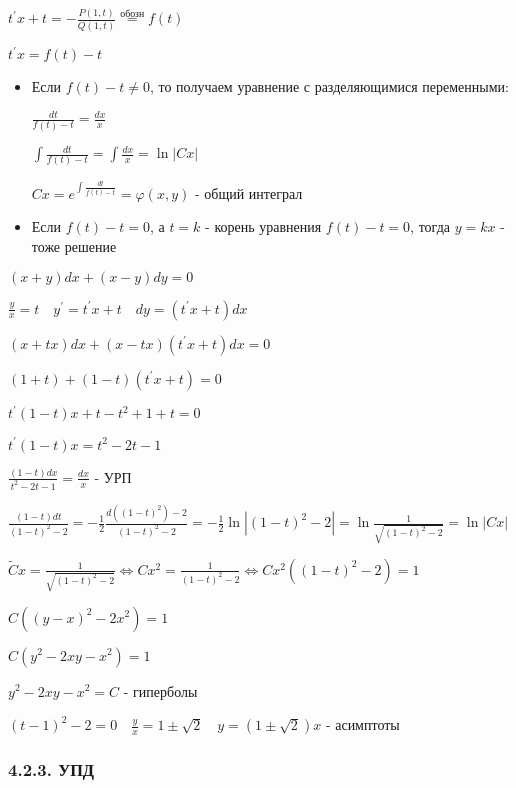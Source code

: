 \documentclass[12pt]{article}
\begin{document}
    $t^\prime x + t = -\frac{P(1, t)}{Q(1, t)} \stackrel{\text{обозн}}{=} f(t)$

    $t^\prime x = f(t) - t$

    \begin{itemize}
        \item Если $f(t) - t \neq 0$, то получаем уравнение с разделяющимися переменными:

        $\frac{dt}{f(t) - t} = \frac{dx}{x}$

        $\int\frac{dt}{f(t) - t} = \int\frac{dx}{x} = \ln|Cx|$

        $Cx = e^{\int\frac{dt}{f(t) - t}} = \varphi(x, y)$ - общий интеграл

        \item Если $f(t) - t = 0$, а $t = k$ - корень уравнения $f(t) - t = 0$, тогда $y = kx$ - тоже решение
    \end{itemize}

    \Ex $(x + y)dx + (x - y)dy = 0$

    $\frac{y}{x} = t \quad y^\prime = t^\prime x + t \quad dy = (t^\prime x + t)dx$

    $(x + tx)dx + (x - tx)(t^\prime x + t)dx = 0$

    $(1 + t) + (1 - t)(t^\prime x + t) = 0$

    $t^\prime (1 - t) x + t - t^2 + 1 + t = 0$

    $t^\prime (1 - t) x = t^2 - 2t - 1$

    $\frac{(1 - t) dx}{t^2 - 2t - 1} = \frac{dx}{x}$ - УРП

    $\frac{(1 - t)dt}{(1 - t)^2 - 2} = -\frac{1}{2}\frac{d((1 - t)^2) - 2}{(1 - t)^2 - 2} = -\frac{1}{2}\ln|(1 - t)^2 - 2| = \ln\frac{1}{\sqrt{(1 - t)^2 - 2}} = \ln|Cx|$

    $\tilde{C}x = \frac{1}{\sqrt{(1 - t)^2 - 2}} \Longleftrightarrow Cx^2 = \frac{1}{(1 - t)^2 - 2} \Longleftrightarrow Cx^2 ((1 - t)^2 - 2) = 1$

    $C ((y - x)^2 - 2x^2) = 1$

    $C (y^2 - 2xy - x^2) = 1$

    $y^2 - 2xy - x^2 = C$ - гиперболы

    $(t - 1)^2 - 2 = 0 \quad \frac{y}{x} = 1 \pm \sqrt{2} \quad y = (1 \pm \sqrt{2})x$ - асимптоты

    \hypertarget{equationincompletedifferentials}{}

    \subsubsection{4.2.3. УПД}
\end{document}
